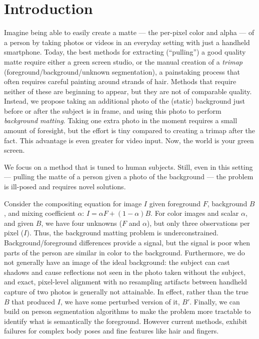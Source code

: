 \documentclass[10pt,twocolumn,letterpaper]{article}
\begin{document}
 \vspace{-1em}
\section{Introduction}
\label{sec:intro}



Imagine being able to easily create a matte — the per-pixel color and alpha — of a person by taking photos or videos in an everyday setting with just a handheld smartphone.  Today, the best methods for extracting (“pulling”) a good quality matte require either a green screen studio, or the manual creation of a {\em trimap} (foreground/background/unknown segmentation), a painstaking process that often requires careful painting around strands of hair.  Methods that require neither of these are beginning to appear, but they are not of comparable quality.  Instead, we propose taking an additional photo of the (static) background just before or after the subject is in frame, and using this photo to perform {\em background matting}.  Taking one extra photo in the moment requires a small amount of foresight, but the effort is tiny compared to creating a trimap after the fact. This advantage is even greater for video input.  Now, the world is your green screen.   

We focus on a method that is tuned to human subjects.
Still, even in this setting — pulling the matte of a person given a photo of the background — the problem is ill-posed and requires novel solutions. 

Consider the compositing equation for image $I$ given foreground $F$, background $B$, and mixing coefficient $\alpha$: $I=\alpha F + (1-\alpha) B.$
For color images and scalar $\alpha$, and given $B$, we have four unknowns ($F$ and $\alpha$), but only three observations per pixel ($I$).  Thus, the background matting problem is underconstrained.  Background/foreground differences 
provide a signal, but the signal is poor when parts of the person are similar in color to the background.  Furthermore, we do not generally have an image of the ideal background: the subject can cast shadows and cause reflections not seen in the photo taken without the subject, and exact, pixel-level alignment with no resampling artifacts between handheld capture of two photos is generally not attainable.  In effect, rather than the true $B$ that produced $I$, we have some perturbed version of it, $B'$. Finally, we can build on person segmentation algorithms to make the problem more tractable to identify what is semantically the foreground. However current methods, exhibit failures for complex body poses and fine features like hair and fingers. 
\end{document}
